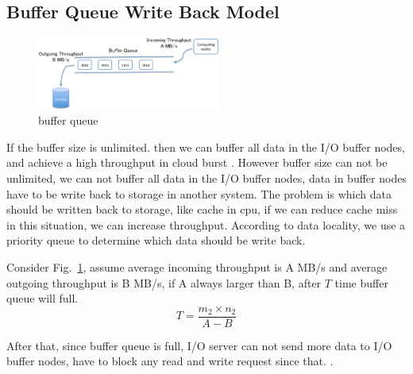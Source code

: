 
\subsection{Buffer Queue Write Back Model}

\begin{figure}[tb]
	\centering
	\includegraphics[width=6cm]{../img/buffer_queue}
	\caption{buffer queue}
	\label{buffer queue}
\end{figure}

If the buffer size is unlimited. then we can buffer all data in the I/O buffer nodes, and achieve a high throughput in cloud burst .
However buffer size can not be unlimited, we can not buffer all data in the I/O buffer nodes, data in buffer nodes have to be write back to storage in another system.
The problem is which data should be written back to storage, like cache in cpu, if we can reduce cache miss in this situation, we can increase throughput. 
According to data locality, we use a priority queue to determine which data should be write back.

Consider Fig.~\ref{buffer queue}, assume average incoming throughput is A MB/s and average outgoing throughput is B MB/s, if A always larger than B, after $T$ time buffer queue will full.
\[T=\frac{m_2\times n_2}{A-B}\]

After that, since buffer queue is full, I/O server can not send more data to I/O buffer nodes, have to block any read and write request since that.
.

